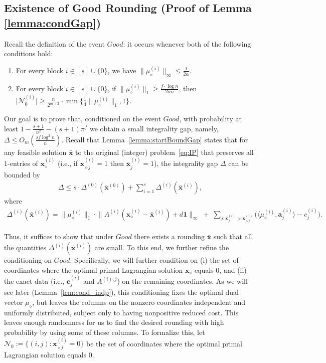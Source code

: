 \documentclass{article}
\newcommand{\cN}{\mathcal{N}}
\newcommand{\av}[0]{\mathbf{a}}
\newcommand{\cv}[0]{\mathbf{c}}
\newcommand{\xv}[0]{\mathbf{x}}
\newcommand{\ones}{{\bm{1}}}
\newcommand{\normm}[1]{\big\lVert#1\big\rVert}
\begin{document}
\subsection{Existence of Good Rounding (Proof of Lemma \ref{lemma:condGap})} \label{sec:goodRounding}

Recall the definition of the event $Good$: it occurs whenever both of the
following conditions hold:
\begin{enumerate}
    \item For every block $i \in [s] \cup \{0\}$, we have
    $\big\|\mu_{\diamond}^{(i)}\big\|_{\infty} \leq \frac{1}{2\alpha}$.
    \item For every block $i \in [s] \cup \{0\}$, if
    $\big\|\mu_{\diamond}^{(i)}\big\|_1 \ge \frac{f \cdot \log n}{2 \alpha n}$,
    then
    $\big|\mathcal{N}_0^{(i)}\big|
        \geq \frac{n}{2^{m+2}} \cdot
        \min\Big\{ \tfrac{1}{4}\normm{\mu^{(i)}_\diamond}_1, 1\Big\}.$
\end{enumerate}

Our goal is to prove that, conditioned on the event $Good$, with probability at
least $1 - \frac{s+1}{n^2} - (s+1)\pi^f$ we obtain a small integrality gap,
namely,$
\Delta \le O_m\!\left(\frac{s f \log^2 n}{n}\right).$
Recall that Lemma~\ref{lemma:startBoundGap} states that for any feasible solution
$\bar{\xv}$ to the original (integer) problem~\eqref{eq:IP} that preserves all
$1$-entries of $\xv^{(i)}_{\diamond}$ (i.e., if
$\xv^{(i)}_{\diamond j} = 1$ then $\bar{\xv}^{(i)}_j = 1$), the integrality gap
$\Delta$ can be bounded by
\begin{align}
    \Delta \leq s \cdot \Delta^{(0)}(\bar{\xv}^{(0)}) + \sum_{i=1}^{s} \Delta^{(i)}(\bar{\xv}^{(i)}),
    \label{eq:deltaRecap}
\end{align}
where
%
\begin{align}
\Delta^{(i)}(\bar{\xv}^{(i)}) =
\big\|\mu^{(i)}_{\diamond}\big\|_1 \cdot
\big\| A^{(i)} (\xv^{(i)}_{\diamond} - \bar{\xv}^{(i)}) + d \ones\big\|_{\infty}
\;+\;
\sum_{j : \bar{\xv}^{(i)}_j > \xv^{(i)}_{\diamond j}}
\Big(\langle \mu^{(i)}_{\diamond}, \av^{(i)}_j\rangle - c^{(i)}_j\Big).
\label{eq:delta_i}
\end{align}

Thus, it suffices to show that under $Good$ there exists a rounding $\bar{\xv}$
such that all the quantities $\Delta^{(i)}(\bar{\xv}^{(i)})$ are small.
To this end, we further refine the conditioning on $Good$.
Specifically, we will further condition on (i) the set of coordinates where the optimal
primal Lagrangian solution $\xv_{\diamond}$ equals $0$, and (ii) the exact data
(i.e., $\cv^{(i)}_j$ and $A^{(i),j}$) on the remaining coordinates.
As we will see later (Lemma~\ref{lem:cond_indp}), this conditioning fixes the
optimal dual vector $\mu_{\diamond}$, but leaves the columns on the nonzero
coordinates independent and uniformly distributed, subject only to having
nonpositive reduced cost.
This leaves enough randomness for us to find the desired rounding with high
probability by using some of these columns.
To formalize this, let
$
\cN_0 := \{(i,j) : \xv^{(i)}_{\diamond j} = 0\}$
be the set of coordinates where the optimal primal Lagrangian solution equals
$0$.
\end{document}
